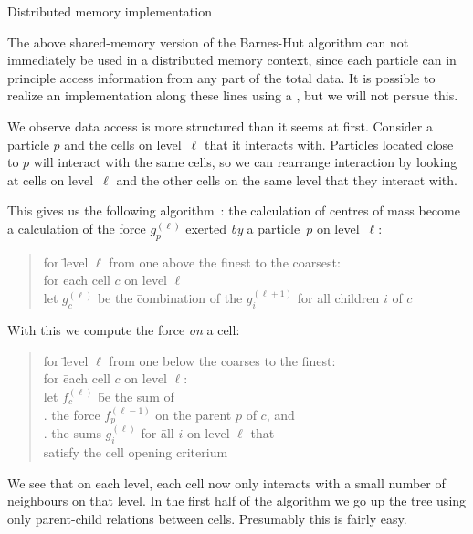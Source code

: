  {Distributed memory implementation}

The above shared-memory version of the Barnes-Hut algorithm can not
immediately be used in a distributed memory context, since each
particle can in principle access information from any part of the
total data. It is possible to realize an implementation along these
lines using a , but we will not persue
this.

We observe data access is more structured than it seems at
first. Consider a particle $p$ and the cells on level~$\ell$ that it
interacts with. Particles located close to $p$ will interact with the
same cells, so we can rearrange interaction by looking at cells on
level~$\ell$ and the other cells on the same level that they interact
with.

This gives us the following algorithm~\cite{Katzenelson:nbody}: the
calculation of centres of mass become a calculation of the force
$g^{(\ell)}_p$ exerted \emph{by} a particle~$p$ on level~$\ell$:
\begin{quotation}
  \begin{tabbing}
    for \=level $\ell$ from one above the finest to the coarsest:\\
    \>for \=each cell $c$ on level $\ell$\\
    \>\>let $g^{(\ell)}_c$ be the \=combination of the $g^{(\ell+1)}_i$
    for all children $i$ of $c$
  \end{tabbing}
\end{quotation}
With this we compute the force \emph{on} a cell:
\begin{quotation}
  \begin{tabbing}
    for \=level $\ell$ from one below the coarses to the finest:\\
    \>for \=each cell $c$ on level $\ell$:\\
    \>\>let $f^{(\ell)}_c$ \=be the sum of\\
    \>\>. the force $f^{(\ell-1)}_p$ on the parent $p$ of $c$, and\\
    \>\>. the sums $g^{(\ell)}_i$ for \=all $i$ on level $\ell$ that\\
    \>\>\>\>satisfy the cell opening criterium
  \end{tabbing}
\end{quotation}

We see that on each level, each cell now only interacts with a small
number of neighbours on that level. In the first half of the algorithm
we go up the tree using only parent-child relations between
cells. Presumably this is fairly easy.


